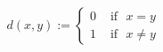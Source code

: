 \documentclass[preview]{standalone}
\begin{document}
\begin{align*}
d(x,y) := \begin{cases}0  &  \text{ if} \ \ \ x=y \\1 &  \text{ if} \ \ \ x \neq y\end{cases}
\end{align*}
\end{document}
